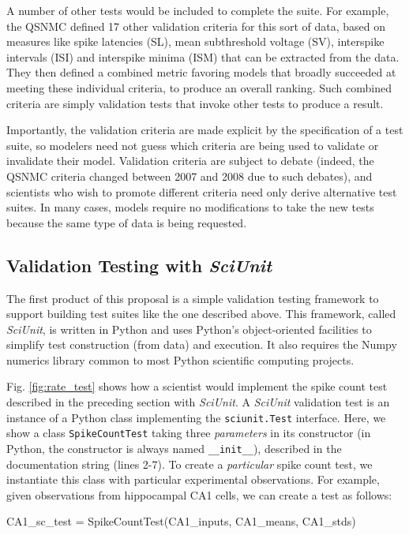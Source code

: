 \documentclass[11pt,letterpaper]{article}
\let\verbx\lstinline
\begin{document}
A number of other tests would be included to complete the suite. For example, the QSNMC defined 17 other validation criteria for this sort of data, based on measures like spike latencies (SL), mean subthreshold voltage (SV), interspike intervals (ISI) and interspike minima (ISM) that can be extracted from the data\cite{jolivet_quantitative_2008}. They then defined a combined metric favoring models that broadly succeeded at meeting these individual criteria, to produce an overall ranking. Such combined criteria are simply validation tests that invoke other tests to produce a result.

Importantly, the validation criteria are made explicit by the specification of a test suite, so modelers need not guess which criteria are being used to validate or invalidate their model. Validation criteria are subject to debate (indeed, the QSNMC criteria changed between 2007 and 2008 due to such debates), and scientists who wish to promote different criteria need only derive alternative test suites. In many cases, models require no modifications to take the new tests because the same type of data is being requested.

\subsection{Validation Testing with \emph{SciUnit}} 
The first product of this proposal is a simple validation testing framework to support building test suites like the one described above. This framework, called \emph{SciUnit}, is written in Python and uses Python's object-oriented facilities to simplify test construction (from data) and execution\cite{python_oo_url}.  It also requires the Numpy numerics library common to most Python scientific computing projects\cite{numpy_url}.

Fig. \ref{fig:rate_test} shows how a scientist would implement the spike count test described in the preceding section with \textit{SciUnit}. A \textit{SciUnit} validation test is an {instance} of a Python class implementing the \verbx{sciunit.Test} interface. Here, we show a class \verbx{SpikeCountTest} taking three \emph{parameters} in its constructor (in Python, the constructor is always named \verbx{__init__}), described in the documentation string (lines 2-7). To create a \emph{particular} spike count test, we instantiate this class with particular experimental observations. For example, given observations from hippocampal CA1 cells, we can create a test as follows:
\begin{python}
  CA1_sc_test = SpikeCountTest(CA1_inputs, CA1_means, CA1_stds)
\end{python}
\end{document}
